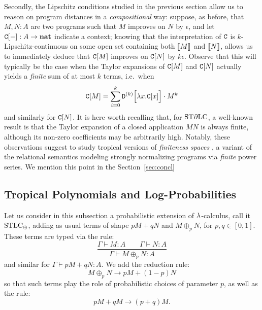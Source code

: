 Secondly, the Lipschitz conditions studied in the previous section allow us to reason on program distances in a \emph{compositional} way: suppose, as before, that $M,N:A$ are two programs such that $M$ improves on $N$ by $\epsilon$, and let $\mathtt{C}[-]:A \to \mathbf{nat}$ indicate a context; knowing that the interpretation of $\mathtt{C}$ is $k$-Lipschitz-continuous on some open set containing both $\llbracket M\rrbracket$ and $\llbracket N\rrbracket$, allows us to immediately deduce that $\mathtt{C}[M]$ improves on $\mathtt{C}[N]$ by $k \epsilon$. 
Observe that this will typically be the case when the Taylor expansions of $\mathtt{C}[M]$ and $\mathtt{C}[N]$ actually yields a \emph{finite} sum of at most $k$ terms, i.e.~when 
\begin{align}
\mathtt{C}[M] = \sum_{i=0}^{k} \mathtt{D}^{(k)}\Big[\lambda x.\mathtt{C}[x]\Big]\cdot M^{k}
\end{align}
and similarly for $\mathtt{C}[N]$. It is here worth recalling that, for $\mathrm{ST}\partial\mathrm{LC}$, a well-known result \cite{} is that the Taylor expansion of a closed application $MN$ is always finite, although its non-zero coefficients may be arbitrarily high. 
Notably, these observations suggest to study tropical versions of \emph{finiteness spaces} \cite{}, 
a variant of the relational semantics modeling strongly normalizing programs via \emph{finite} power series.
We mention this point in the Section~\ref{sec:concl}


\subsection{Tropical Polynomials and Log-Probabilities}

Let us consider in this subsection a probabilistic extension of $\lambda$-calculus, call it $\mathrm{STLC}_\oplus$, adding as usual terms of shape $pM+qN$ and $M\oplus_p N$, for $p,q\in[0,1]$.
These terms are typed via the rule:
\[
 \dfrac{\Gamma\vdash M:A \qquad \Gamma\vdash N:A}{\Gamma\vdash M\oplus_p N:A}
\]
and similar for $\Gamma\vdash pM+qN:A$.
We add the reduction rule:
\[
 M\oplus_p N \to pM+(1-p)N
\]
so that such terms play the role of probabilistic choices of parameter $p$, as well as the rule:
\[
 pM+qM\to (p+q)M.
\]

